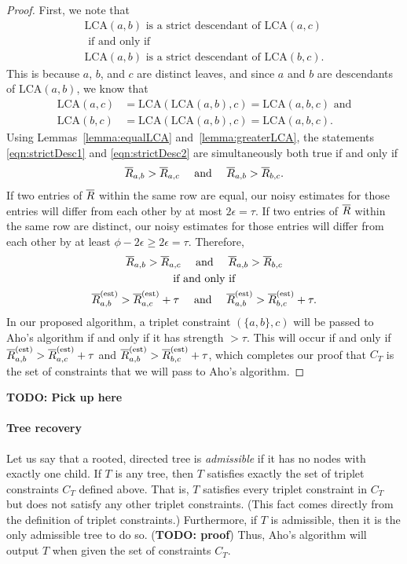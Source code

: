 \documentclass{article}
\theoremstyle{definition}
\newcommand{\LCA}{\text{LCA}}
\newcommand{\RbarEst}{\Rbar^\text{(est)}}
\begin{document}
\begin{proof}
First, we note that
\begin{gather}
\LCA(a,b) \text{ is a strict descendant of } \LCA(a,c) \label{eqn:strictDesc1} \\
\text{ if and only if } \nonumber \\
\LCA(a,b) \text{ is a strict descendant of } \LCA(b,c). \label{eqn:strictDesc2}
\end{gather}
This is because $a$, $b$, and $c$ are distinct leaves, and since $a$ and $b$ are descendants of $\LCA(a,b)$, we know that
\begin{align*}
\LCA(a,c) &= \LCA(\LCA(a,b),c) = \LCA(a,b,c) \text{ and} \\
\LCA(b,c) &= \LCA(\LCA(a,b),c) = \LCA(a,b,c).
\end{align*}
Using Lemmas~\ref{lemma:equalLCA} and~\ref{lemma:greaterLCA}, the statements \eqref{eqn:strictDesc1} and \eqref{eqn:strictDesc2} are simultaneously both true if and only if
\begin{gather*}
\overline{R}_{a,b} > \overline{R}_{a,c}
\quad \text{ and } \quad
\overline{R}_{a,b} > \overline{R}_{b,c}.
\end{gather*}
If two entries of $\overline{R}$ within the same row are equal, our noisy estimates for those entries will differ from each other by at most $2\epsilon = \tau$.
If two entries of $\overline{R}$ within the same row are distinct, our noisy estimates for those entries will differ from each other by at least $\phi - 2\epsilon \geq 2\epsilon = \tau$.
Therefore,
\begin{gather*}
\Rbar_{a,b} > \Rbar_{a,c}
\quad \text{ and } \quad
\Rbar_{a,b} > \Rbar_{b,c} \\
%
\text{ if and only if } \\
%
\RbarEst_{a,b} > \RbarEst_{a,c} + \tau
\quad \text{ and } \quad
\RbarEst_{a,b} > \RbarEst_{b,c} + \tau.
\end{gather*}
In our proposed algorithm, a triplet constraint $(\{a,b\},c)$ will be passed to Aho's algorithm if and only if it has strength $> \tau$.
This will occur if and only if $\RbarEst_{a,b} > \RbarEst_{a,c} + \tau$ and $\RbarEst_{a,b} > \RbarEst_{b,c} + \tau$, which completes our proof that $C_T$ is the set of constraints that we will pass to Aho's algorithm.
\end{proof}

{\bf TODO: Pick up here}

\paragraph{Tree recovery}
Let us say that a rooted, directed tree is \emph{admissible} if it has no nodes with exactly one child.
If $T$ is any tree, then $T$ satisfies exactly the set of triplet constraints $C_T$ defined above.
That is, $T$ satisfies every triplet constraint in $C_T$ but does not satisfy any other triplet constraints.
(This fact comes directly from the definition of triplet constraints.)
Furthermore, if $T$ is admissible, then it is the only admissible tree to do so.
({\bf TODO: proof})
Thus, Aho's algorithm will output $T$ when given the set of constraints $C_T$.
\end{document}
